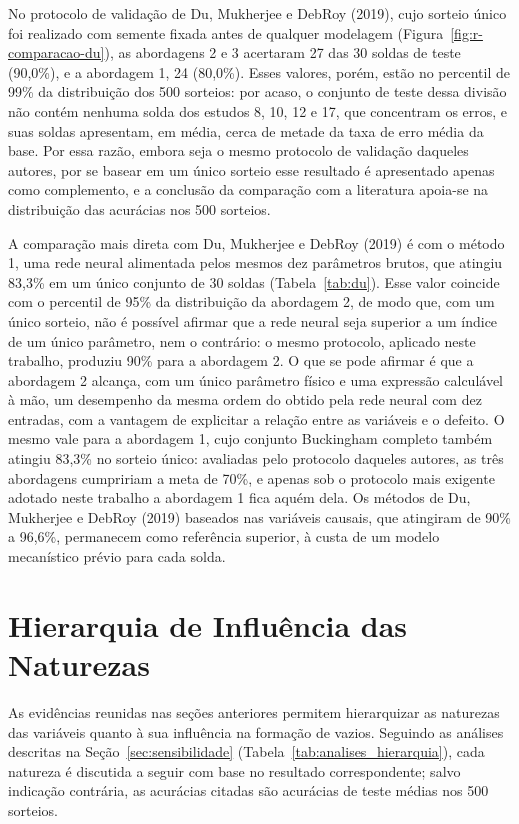\documentclass[12pt,openany]{report}
\begin{document}
No protocolo de validação de Du, Mukherjee e DebRoy (2019), cujo sorteio único foi realizado com semente fixada antes de qualquer modelagem (Figura~\ref{fig:r-comparacao-du}), as abordagens 2 e 3 acertaram 27 das 30 soldas de teste (90,0\%), e a abordagem 1, 24 (80,0\%). Esses valores, porém, estão no percentil de 99\% da distribuição dos 500 sorteios: por acaso, o conjunto de teste dessa divisão não contém nenhuma solda dos estudos 8, 10, 12 e 17, que concentram os erros, e suas soldas apresentam, em média, cerca de metade da taxa de erro média da base. Por essa razão, embora seja o mesmo protocolo de validação daqueles autores, por se basear em um único sorteio esse resultado é apresentado apenas como complemento, e a conclusão da comparação com a literatura apoia-se na distribuição das acurácias nos 500 sorteios.

A comparação mais direta com Du, Mukherjee e DebRoy (2019) é com o método 1, uma rede neural alimentada pelos mesmos dez parâmetros brutos, que atingiu 83,3\% em um único conjunto de 30 soldas (Tabela~\ref{tab:du}). Esse valor coincide com o percentil de 95\% da distribuição da abordagem 2, de modo que, com um único sorteio, não é possível afirmar que a rede neural seja superior a um índice de um único parâmetro, nem o contrário: o mesmo protocolo, aplicado neste trabalho, produziu 90\% para a abordagem 2. O que se pode afirmar é que a abordagem 2 alcança, com um único parâmetro físico e uma expressão calculável à mão, um desempenho da mesma ordem do obtido pela rede neural com dez entradas, com a vantagem de explicitar a relação entre as variáveis e o defeito. O mesmo vale para a abordagem 1, cujo conjunto Buckingham completo também atingiu 83,3\% no sorteio único: avaliadas pelo protocolo daqueles autores, as três abordagens cumpririam a meta de 70\%, e apenas sob o protocolo mais exigente adotado neste trabalho a abordagem 1 fica aquém dela. Os métodos de Du, Mukherjee e DebRoy (2019) baseados nas variáveis causais, que atingiram de 90\% a 96,6\%, permanecem como referência superior, à custa de um modelo mecanístico prévio para cada solda.

\section{Hierarquia de Influência das Naturezas}
\label{sec:hierarquia}

As evidências reunidas nas seções anteriores permitem hierarquizar as naturezas das variáveis quanto à sua influência na formação de vazios. Seguindo as análises descritas na Seção~\ref{sec:sensibilidade} (Tabela~\ref{tab:analises_hierarquia}), cada natureza é discutida a seguir com base no resultado correspondente; salvo indicação contrária, as acurácias citadas são acurácias de teste médias nos 500 sorteios.
\end{document}
